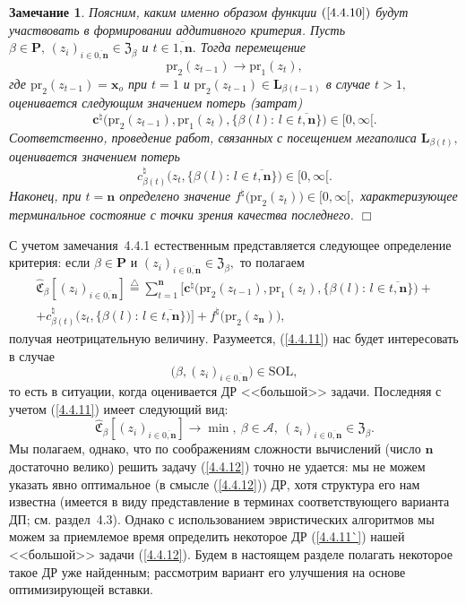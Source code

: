 \documentclass[11pt,twoside,openany]{report}
\newcommand{\bfn}{\begin{equation}}
\newcommand{\efn}{\end{equation}}
\newcommand{\df}{\stackrel{\triangle}{=}}
\newcommand{\ov}{\overline}
\newcounter{theo}
\newcounter{zam}
\newtheorem{zam}{Замечание}[section]
\begin{document}
{\begin{zam}\label{z4.4.1} Поясним, каким именно образом функции $(\ref{4.4.10})$
будут участвовать в формировании аддитивного критерия. Пусть $\beta\in \mathbf{P},\,
(z_i)_{i\in\ov{0,\mathbf{n}}} \in \mathfrak{Z}_\beta$ и $t\in \ov{1,\mathbf{n}}.$ Тогда перемещение
$$
\mathrm{pr}_2(z_{t-1}) \longrightarrow \mathrm{pr}_1(z_t),
$$
где $\mathrm{pr}_2(z_{t-1}) = \mathbf{x}_o$ при $t=1$ и
$\mathrm{pr}_2(z_{t-1})\in \mathbf{L}_{\beta(t-1)}$
в случае $t> 1,$ оценивается следующим значением потерь (затрат)
$$
\mathbf{c}^\natural\bigl(\mathrm{pr}_2(z_{t-1}),\mathrm{pr}_1(z_t),
\{\beta(l):\,l\in \ov{t,\mathbf{n}} \}\bigl)\in [0,\infty[.
$$
Соответственно, проведение работ, связанных  с посещением мегаполиса $\mathbf{L}_{\beta(t)},$
оценивается значением потерь
$$
c_{\beta(t)}^\natural\bigl(z_t,\{\beta(l):\,l\in \ov{t,\mathbf{n}}\}\bigl)\in [0,\infty[.
$$
Наконец, при $t = \mathbf{n}$ определено значение $f^\natural\bigl(\mathrm{pr}_2(z_t)\bigl)\in
[0,\infty[,$ характеризующее  терминальное состояние с точки
зрения качества последнего. \hfill $\Box$
\end{zam}

С учетом замечания~4.4.1 естественным представляется следующее определение критерия:
если $\beta\in \mathbf{P}$ и $(z_i)_{i\in\ov{0,\mathbf{n}}}\in \mathfrak{Z}_\beta,$
то полагаем
\begin{eqnarray}
&\widehat{\mathfrak{C}}_\beta[(z_i)_{i\in\ov{0,\mathbf{n}}}]\df
\sum\limits_{t=1}^\mathbf{n}
\bigl[\mathbf{c}^\natural\bigl(\mathrm{pr}_2(z_{t-1}),\mathrm{pr}_1(z_t),\{\beta(l):\,l\in
\ov{t,\mathbf{n}}\}\bigl) +
&\nonumber\\
&+ c_{\beta(t)}^\natural\bigl(z_t, \{\beta(l):\,l\in
\ov{t,\mathbf{n}}\}\bigl)\bigl] + f^\natural\bigl(\mathrm{pr}_2(z_\mathbf{n})\bigl),
&\label{4.4.11}
\end{eqnarray}
получая неотрицательную величину. Разумеется, (\ref{4.4.11}) нас будет интересовать в случае
\bfn\label{4.4.11`}\bigl(\beta,(z_i)_{i\in\ov{0,\mathbf{n}}}\bigl)\in \mathrm{SOL},
\efn
то есть в ситуации, когда оценивается ДР <<большой>> задачи. Последняя с учетом
(\ref{4.4.11}) имеет следующий вид:
\bfn\label{4.4.12}
\widehat{\mathfrak{C}}_\beta [(z_i)_{i\in \ov{0,\mathbf{n}}}] \longrightarrow
\min,\ \beta \in \mathcal{A},\ (z_i)_{i\in \ov{0,\mathbf{n}}}\in \mathfrak{Z}_\beta.
\efn
Мы полагаем, однако, что по соображениям сложности вычислений (число $\mathbf{n}$
достаточно велико) решить задачу (\ref{4.4.12}) точно не удается: мы не можем указать
явно оптимальное (в смысле (\ref{4.4.12})) ДР, хотя структура его нам известна
(имеется в виду представление в терминах соответствующего варианта ДП; см. раздел~4.3).
Однако с использованием эвристических алгоритмов мы можем за приемлемое время определить
некоторое ДР (\ref{4.4.11`}) нашей <<большой>> задачи (\ref{4.4.12}). Будем в настоящем
разделе полагать некоторое такое ДР уже найденным; рассмотрим вариант его улучшения на
основе оптимизирующей вставки.

}
\end{document}
